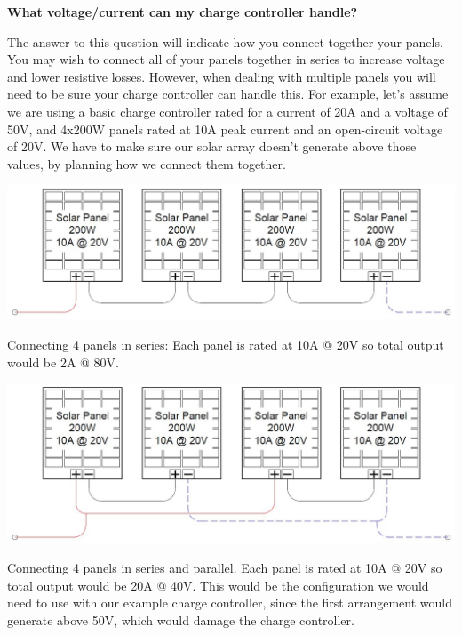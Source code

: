 \documentclass{article}
\theoremstyle{definition}
\theoremstyle{definition}
\theoremstyle{remark}
\begin{document}
  \textbf{What voltage/current can my charge controller handle?}

  The answer to this question will indicate how you connect together your panels. You may wish to connect all of your panels together in series to increase voltage and lower resistive losses. However, when dealing with multiple panels you will need to be sure your charge controller can handle this. For example, let’s assume we are using a basic charge controller rated for a current of 20A and a voltage of 50V, and 4x200W panels rated at 10A peak current and an open-circuit voltage of 20V. We have to make sure our solar array doesn’t generate above those values, by planning how we connect them together.
  
  \begin{center}
    \includegraphics[width=0.75\paperwidth]{Images/image_13_2_(whole_system_2).png}
  \end{center}
  
  Connecting 4 panels in series: Each panel is rated at 10A @ 20V so total output would be 2A @ 80V.

  \begin{center}
    \includegraphics[width=0.75\paperwidth]{Images/image_13_3_(whole_system_3).png}
  \end{center}

  Connecting 4 panels in series and parallel. Each panel is rated at 10A @ 20V so total output would be 20A @ 40V. This would be the configuration we would need to use with our example charge controller, since the first arrangement would generate above 50V, which would damage the charge controller.
\end{document}
